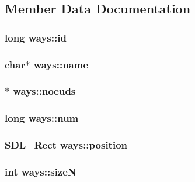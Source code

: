 \subsection{Member Data Documentation}
\hypertarget{structways_a10c2d14355f8d8e21d51869cdd4e456c}{
\subsubsection[{id}]{\setlength{\rightskip}{0pt plus 5cm}long ways\-::id}}\label{structways_a10c2d14355f8d8e21d51869cdd4e456c}
\hypertarget{structways_ad15396786280ed888a09c62ca08b8e02}{
\subsubsection[{name}]{\setlength{\rightskip}{0pt plus 5cm}char$\ast$ ways\-::name}}\label{structways_ad15396786280ed888a09c62ca08b8e02}
\hypertarget{structways_a3d3a53dc916fd3049e5564013e0c4a38}{
\subsubsection[{noeuds}]{$\ast$ ways\-::noeuds}}\label{structways_a3d3a53dc916fd3049e5564013e0c4a38}
\hypertarget{structways_ae3cb2ed1694343a718b7bd67c0cb87bc}{
\subsubsection[{num}]{\setlength{\rightskip}{0pt plus 5cm}long ways\-::num}}\label{structways_ae3cb2ed1694343a718b7bd67c0cb87bc}
\hypertarget{structways_ae0cc4341e9f2737c265d26ac47d567d5}{
\subsubsection[{position}]{\setlength{\rightskip}{0pt plus 5cm}S\-D\-L\-\_\-\-Rect ways\-::position}}\label{structways_ae0cc4341e9f2737c265d26ac47d567d5}
\hypertarget{structways_a6f011f2876fc323ebe85ac08d2b272cc}{
\subsubsection[{size\-N}]{\setlength{\rightskip}{0pt plus 5cm}int ways\-::size\-N}}\label{structways_a6f011f2876fc323ebe85ac08d2b272cc}
